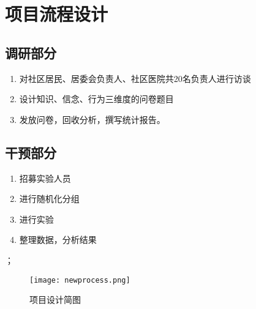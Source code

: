 \section{项目流程设计}
\subsection{调研部分}
\begin{enumerate}
    \item 对社区居民、居委会负责人、社区医院共20名负责人进行访谈
    \item 设计知识、信念、行为三维度的问卷题目
    \item 发放问卷，回收分析，撰写统计报告。
\end{enumerate}
\subsection{干预部分}
\begin{enumerate}
\item 招募实验人员
\item 进行随机化分组
\item 进行实验
\item 整理数据，分析结果
\end{enumerate}；
\begin{figure}[th]
	\texttt{[image: newprocess.png]}
	\centering
	\caption{项目设计简图}
\end{figure}